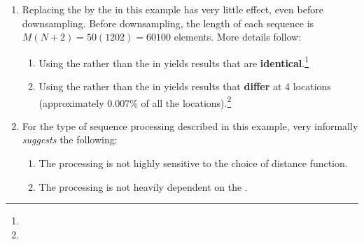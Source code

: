 \begin{example}
\begin{enumerate}
  \item \label{item:wrdie_hp_R3_euclid}
        Replacing the  by the  in this example
        has very little effect, even before downsampling.
        Before downsampling, the length of each sequence is $M(N+2)=50(1202)=60100$ elements.
        More details follow:
        \begin{enumerate}
          \item Using the  rather than the  
                in  yields results that are 
                \textbf{identical}.\footnote{} %

          \item \label{item:wrdie_hp_R3_hann50_euclid}
                Using the  rather than the  
                in 
                yields results that \textbf{differ} at 4 locations 
                (approximately 0.007\% of all the locations).\footnote{} %

        \end{enumerate}

  \item For the type of sequence processing described in this example, 
          very informally \emph{suggests} the following:
          \begin{enumerate}
            \item The processing is not highly sensitive to the choice of distance function.
            \item The processing is not heavily dependent on the .
          \end{enumerate}
\end{enumerate}
\end{example}

